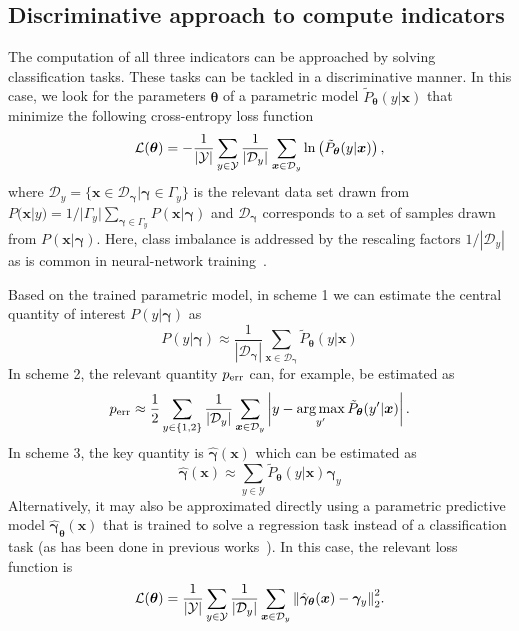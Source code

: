 \subsection{Discriminative approach to compute indicators}\label{sec:discr_indicators}
The computation of all three indicators can be approached by solving classification tasks. These tasks can be tackled in a discriminative manner. In this case, we look for the parameters $\bm{\theta}$ of a parametric model $\tilde{P}_{\bm{\theta}}(y|\bm{x})$ that minimize the following cross-entropy loss function
\begin{equation}\label{eq:SI_x1}
    \mathcal{L}(\bm{\theta}) = - \frac{1}{|\mathcal{Y}|} \sum_{y \in \mathcal{Y}} \frac{1}{|\mathcal{D}_{y}|} \sum_{\bm{x} \in \mathcal{D}_{y}}  {\rm ln}\left(\tilde{P}_{\bm{\theta}}(y|\bm{x})\right),
\end{equation}
where $\mathcal{D}_{y} = \{ \bm{x} \in \mathcal{D}_{\bm{\gamma}} |\bm{\gamma} \in \Gamma_{y}\}$ is the relevant data set drawn from $P(\bm{x}|y)=1/|\Gamma_{y}| \sum_{\bm{\gamma} \in \Gamma_{y}} P(\bm{x}|\bm{\gamma})$ and $\mathcal{D}_{\bm{\gamma}}$ corresponds to a set of samples drawn from $P(\bm{x}|\bm{\gamma})$. Here, class imbalance is addressed by the rescaling factors $1/|\mathcal{D}_{y}|$ as is common in neural-network training~\cite{paszke:2019}. 

Based on the trained parametric model, in scheme 1 we can estimate the central quantity of interest $P(y|\bm{\gamma})$ as 
\begin{equation}\label{eq:SL_1}
    P(y|\bm{\gamma}) \approx \frac{1}{|\mathcal{D}_{\bm{\gamma}}|}\sum_{\bm{x} \in \mathcal{D}_{\bm{\gamma}}} \tilde{P}_{\bm{\theta}}(y|\bm{x})
\end{equation}
In scheme 2, the relevant quantity $p_{\rm err}$ can, for example, be estimated as
\begin{equation}\label{eq:LBC_err_SI}
    p_{\rm err} \approx \frac{1}{2}\sum_{y \in \{1,2 \}} \frac{1}{|\mathcal{D}_{y}|}\sum_{\bm{x} \in \mathcal{D}_{y}} \left|y- \operatorname*{arg\,max}_{y'} \tilde{P}_{\bm{\theta}}(y'|\bm{x})\right|.
\end{equation}
In scheme 3, the key quantity is $\hat{\bm{\gamma}}(\bm{x})$ which can be estimated as
\begin{equation}\label{eq:PBM_pred_SI}
    \hat{\bm{\gamma}}(\bm{x}) \approx \sum_{y \in \mathcal{Y}} \tilde{P}_{\bm{\theta}}(y|\bm{x})\bm{\gamma}_{y}
\end{equation}
Alternatively, it may also be approximated directly using a parametric predictive model $\hat{\bm{\gamma}}_{\bm{\theta}}(\bm{x})$ that is trained to solve a regression task instead of a classification task (as has been done in previous works~\cite{schaefer:2019,greplova:2020,arnold:2021,arnold:2022}). In this case, the relevant loss function is
\begin{equation}\label{eq:SI_x2}
    \mathcal{L}(\bm{\theta}) = \frac{1}{|\mathcal{Y}|} \sum_{y \in \mathcal{Y}} \frac{1}{|\mathcal{D}_{y}|} \sum_{\bm{x} \in \mathcal{D}_{y}}  \norm{\hat{\bm{\gamma}}_{\bm{\theta}}(\bm{x}) - \bm{\gamma}_{y}}_{2}^2.
\end{equation}

